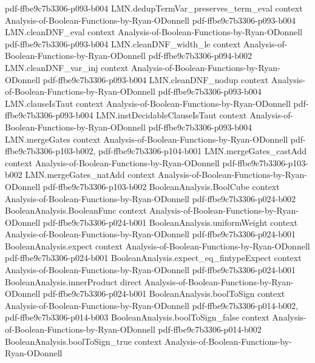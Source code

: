 \begin{lemma}
  {pdf-ffbe9c7b3306-p093-b004}
\proofstep
  {LMN.dedupTermVar_preserves_term_eval}
  {context}
  {Analysis-of-Boolean-Functions-by-Ryan-ODonnell}
  {pdf-ffbe9c7b3306-p093-b004}
\proofstep
  {LMN.cleanDNF_eval}
  {context}
  {Analysis-of-Boolean-Functions-by-Ryan-ODonnell}
  {pdf-ffbe9c7b3306-p093-b004}
\proofstep
  {LMN.cleanDNF_width_le}
  {context}
  {Analysis-of-Boolean-Functions-by-Ryan-ODonnell}
  {pdf-ffbe9c7b3306-p094-b002}
\proofstep
  {LMN.cleanDNF_var_inj}
  {context}
  {Analysis-of-Boolean-Functions-by-Ryan-ODonnell}
  {pdf-ffbe9c7b3306-p093-b004}
\proofstep
  {LMN.cleanDNF_nodup}
  {context}
  {Analysis-of-Boolean-Functions-by-Ryan-ODonnell}
  {pdf-ffbe9c7b3306-p093-b004}
\proofstep
  {LMN.clauseIsTaut}
  {context}
  {Analysis-of-Boolean-Functions-by-Ryan-ODonnell}
  {pdf-ffbe9c7b3306-p093-b004}
\proofstep
  {LMN.instDecidableClauseIsTaut}
  {context}
  {Analysis-of-Boolean-Functions-by-Ryan-ODonnell}
  {pdf-ffbe9c7b3306-p093-b004}
\proofstep
  {LMN.mergeGates}
  {context}
  {Analysis-of-Boolean-Functions-by-Ryan-ODonnell}
  {pdf-ffbe9c7b3306-p103-b002,
    pdf-ffbe9c7b3306-p104-b001}
\proofstep
  {LMN.mergeGates_castAdd}
  {context}
  {Analysis-of-Boolean-Functions-by-Ryan-ODonnell}
  {pdf-ffbe9c7b3306-p103-b002}
\proofstep
  {LMN.mergeGates_natAdd}
  {context}
  {Analysis-of-Boolean-Functions-by-Ryan-ODonnell}
  {pdf-ffbe9c7b3306-p103-b002}
\proofstep
  {BooleanAnalysis.BoolCube}
  {context}
  {Analysis-of-Boolean-Functions-by-Ryan-ODonnell}
  {pdf-ffbe9c7b3306-p024-b002}
\proofstep
  {BooleanAnalysis.BooleanFunc}
  {context}
  {Analysis-of-Boolean-Functions-by-Ryan-ODonnell}
  {pdf-ffbe9c7b3306-p024-b001}
\proofstep
  {BooleanAnalysis.uniformWeight}
  {context}
  {Analysis-of-Boolean-Functions-by-Ryan-ODonnell}
  {pdf-ffbe9c7b3306-p024-b001}
\proofstep
  {BooleanAnalysis.expect}
  {context}
  {Analysis-of-Boolean-Functions-by-Ryan-ODonnell}
  {pdf-ffbe9c7b3306-p024-b001}
\proofstep
  {BooleanAnalysis.expect_eq_fintypeExpect}
  {context}
  {Analysis-of-Boolean-Functions-by-Ryan-ODonnell}
  {pdf-ffbe9c7b3306-p024-b001}
\proofstep
  {BooleanAnalysis.innerProduct}
  {direct}
  {Analysis-of-Boolean-Functions-by-Ryan-ODonnell}
  {pdf-ffbe9c7b3306-p024-b001}
\proofstep
  {BooleanAnalysis.boolToSign}
  {context}
  {Analysis-of-Boolean-Functions-by-Ryan-ODonnell}
  {pdf-ffbe9c7b3306-p014-b002,
    pdf-ffbe9c7b3306-p014-b003}
\proofstep
  {BooleanAnalysis.boolToSign_false}
  {context}
  {Analysis-of-Boolean-Functions-by-Ryan-ODonnell}
  {pdf-ffbe9c7b3306-p014-b002}
\proofstep
  {BooleanAnalysis.boolToSign_true}
  {context}
  {Analysis-of-Boolean-Functions-by-Ryan-ODonnell}

\end{lemma}
